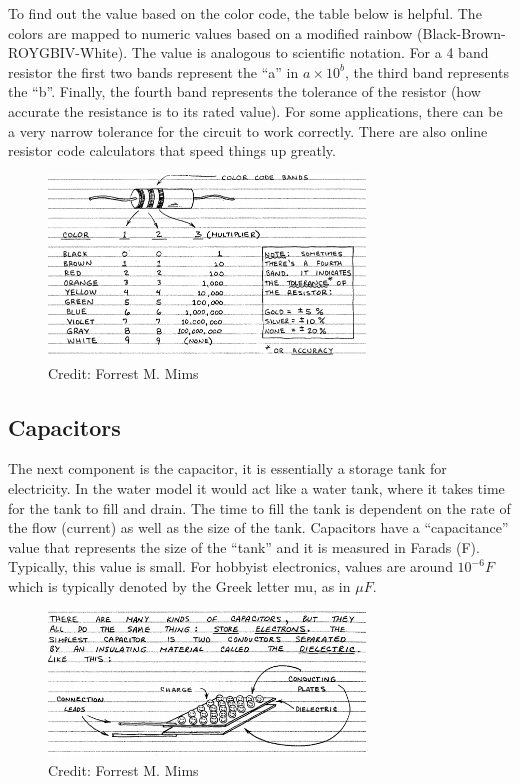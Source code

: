 \documentclass{article}
\begin{document}
      To find out the value based on the color code, the table below is helpful. The colors are
      mapped to numeric values based on a modified rainbow (Black-Brown-ROYGBIV-White). The value is analogous
      to scientific notation. For a 4 band resistor the first two bands represent the ``a'' in $a\times10^{b}$, the third
      band represents the ``b''. Finally, the fourth band represents the tolerance of the resistor (how accurate the resistance
      is to its rated value). For some applications, there can be a very narrow tolerance for the circuit to work correctly. There are also
      online resistor code calculators that speed things up greatly.
      
\begin{figure}[H]
\caption{ Credit: Forrest M. Mims }
\label{fig:img/codes.png}
\centering
\includegraphics[width=0.75\textwidth]{img/codes.png}
\end{figure}

    


    
                    \subsection{Capacitors}
  
      The next component is the capacitor, it is essentially a storage tank for electricity. In the water model it would
      act like a water tank, where it takes time for the tank to fill and drain. The time to fill the tank is dependent on the rate of the flow (current) as
      well as the size of the tank. Capacitors have a ``capacitance'' value that represents the size of the ``tank'' and it is measured in Farads (F). Typically, this
      value is small. For hobbyist electronics, values are around $10^{-6}F$ which is typically denoted by the Greek letter mu, as in $\mu F$.
      
\begin{figure}[H]
\caption{ Credit: Forrest M. Mims }
\label{fig:img/capacitors.png}
\centering
\includegraphics[width=0.75\textwidth]{img/capacitors.png}
\end{figure}
\end{document}
